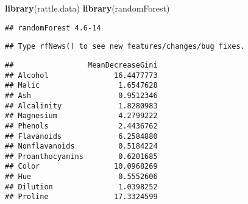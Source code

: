 \documentclass[]{book}
\newenvironment{Shaded}{\begin{snugshade}}{\end{snugshade}}
\newcommand{\CommentTok}[1]{\textcolor[rgb]{0.56,0.35,0.01}{\textit{#1}}}
\newcommand{\DataTypeTok}[1]{\textcolor[rgb]{0.13,0.29,0.53}{#1}}
\newcommand{\DecValTok}[1]{\textcolor[rgb]{0.00,0.00,0.81}{#1}}
\newcommand{\KeywordTok}[1]{\textcolor[rgb]{0.13,0.29,0.53}{\textbf{#1}}}
\newcommand{\NormalTok}[1]{#1}
\newcommand{\OperatorTok}[1]{\textcolor[rgb]{0.81,0.36,0.00}{\textbf{#1}}}
\newcommand{\StringTok}[1]{\textcolor[rgb]{0.31,0.60,0.02}{#1}}
\begin{document}
\begin{Shaded}
\begin{Highlighting}[]
\KeywordTok{library}\NormalTok{(rattle.data)}
\KeywordTok{library}\NormalTok{(randomForest)}
\end{Highlighting}
\end{Shaded}

\begin{verbatim}
## randomForest 4.6-14
\end{verbatim}

\begin{verbatim}
## Type rfNews() to see new features/changes/bug fixes.
\end{verbatim}

\begin{Shaded}
\end{Shaded}

\begin{verbatim}
##                 MeanDecreaseGini
## Alcohol               16.4477773
## Malic                  1.6547628
## Ash                    0.9512346
## Alcalinity             1.8280983
## Magnesium              4.2799222
## Phenols                2.4436762
## Flavanoids             6.2584880
## Nonflavanoids          0.5184224
## Proanthocyanins        0.6201685
## Color                 10.0968269
## Hue                    0.5552606
## Dilution               1.0398252
## Proline               17.3324599
\end{verbatim}
\end{document}
